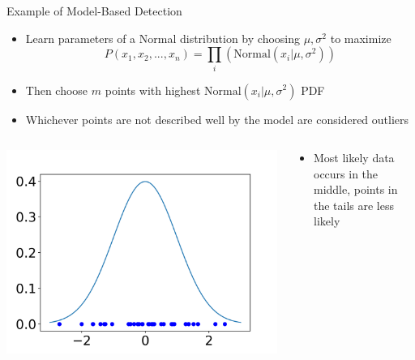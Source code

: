 \documentclass[aspectratio=169]{beamer}
\begin{document}
\begin{frame}{Example of Model-Based Detection}

\begin{itemize}
\item Learn parameters of a Normal distribution by choosing $\mu, \sigma^2$ to maximize
$$P(x_1, x_2, ..., x_n) = \prod_i \left( \textrm{Normal} (x_i | \mu, \sigma^2) \right)$$
\item Then choose $m$ points with highest $\textrm{Normal} (x_i | \mu, \sigma^2) $ PDF
\item Whichever points are not described well by the model are considered outliers
\end{itemize}

\begin{columns}
\begin{column}{0.4\textwidth}
\includegraphics[width=\textwidth]{lectOutliers/normalModel.png}
\end{column}
\begin{column}{0.6\textwidth}
\begin{itemize}
\item Most likely data occurs in the middle, points in the tails are less likely
\end{itemize}
\end{column}
\end{columns}


\end{frame}
\end{document}
